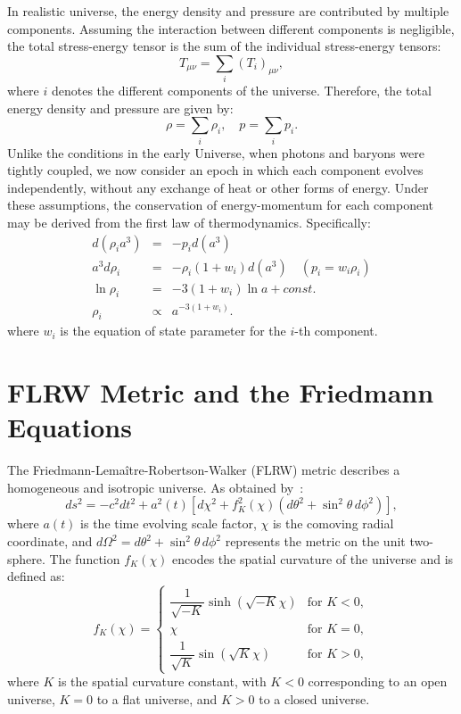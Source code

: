 In realistic universe, the energy density and pressure are contributed by multiple components. Assuming the interaction between different components is negligible, the total stress-energy tensor is the sum of the individual stress-energy tensors:
\begin{equation}
    T_{\mu\nu} = \sum_i (T_i)_{\mu\nu},
\end{equation}
where \( i \) denotes the different components of the universe. Therefore, the total energy density and pressure are given by:
\begin{equation}
    \rho = \sum_i \rho_i, \quad p = \sum_i p_i.
\end{equation}
Unlike the conditions in the early Universe, when photons and baryons were tightly coupled, we now consider an epoch in which each component evolves independently, without any exchange of heat or other forms of energy. Under these assumptions, the conservation of energy-momentum for each component may be derived from the first law of thermodynamics. Specifically:
\begin{eqnarray}
    d\left(\rho_i a^3\right) &=& -p_i d(a^3) \nonumber \\
    a^3 d\rho_i &=& -\rho_i (1 + w_i) d(a^3) \quad (p_i = w_i \rho_i) \nonumber \\
    \ln \rho_i &=& -3(1 + w_i) \ln a + const. \nonumber \\
    \rho_i &\propto& a^{-3(1 + w_i)}.
    \label{eq:energy_density_scaling}
\end{eqnarray}
where \( w_i \) is the equation of state parameter for the \( i \)-th component. 

\section{FLRW Metric and the Friedmann Equations}\label{sec:flrw_metric}
The Friedmann-Lemaître-Robertson-Walker (FLRW) metric describes a homogeneous and isotropic universe. As obtained by~\citet{1972gcpa.book.....W}:
\begin{equation}
    ds^2 = -c^2 dt^2 + a^2(t) \left[ d\chi^2 + f_K^2(\chi) \left( d\theta^2 + \sin^2\theta \, d\phi^2 \right) \right],
    \label{eq:flrw_metric}
\end{equation}
where \( a(t) \) is the time evolving scale factor, \( \chi \) is the comoving radial coordinate, and \( d\Omega^2 = d\theta^2 + \sin^2\theta \, d\phi^2 \) represents the metric on the unit two-sphere. The function \( f_K(\chi) \) encodes the spatial curvature of the universe and is defined as:
\begin{equation}
    f_K(\chi) = 
    \begin{cases}
        \dfrac{1}{\sqrt{-K}} \sinh\left(\sqrt{-K}\chi\right) & \text{for } K < 0, \\
        \chi & \text{for } K = 0, \\
        \dfrac{1}{\sqrt{K}} \sin\left(\sqrt{K}\chi\right) & \text{for } K > 0,
    \end{cases}
    \label{eq:fk_definition}
\end{equation}
where \( K \) is the spatial curvature constant, with \( K < 0 \) corresponding to an open universe, \( K = 0 \) to a flat universe, and \( K > 0 \) to a closed universe.

